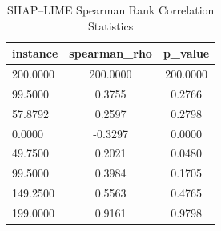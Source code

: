\begin{table}
\centering
\caption{SHAP–LIME Spearman Rank Correlation Statistics}
\label{tab:agreement}
\begin{tabular}{lcc}
\toprule
instance & spearman_rho & p_value \\
\midrule
200.0000 & 200.0000 & 200.0000 \\
99.5000 & 0.3755 & 0.2766 \\
57.8792 & 0.2597 & 0.2798 \\
0.0000 & -0.3297 & 0.0000 \\
49.7500 & 0.2021 & 0.0480 \\
99.5000 & 0.3984 & 0.1705 \\
149.2500 & 0.5563 & 0.4765 \\
199.0000 & 0.9161 & 0.9798 \\
\bottomrule
\end{tabular}
\end{table}
